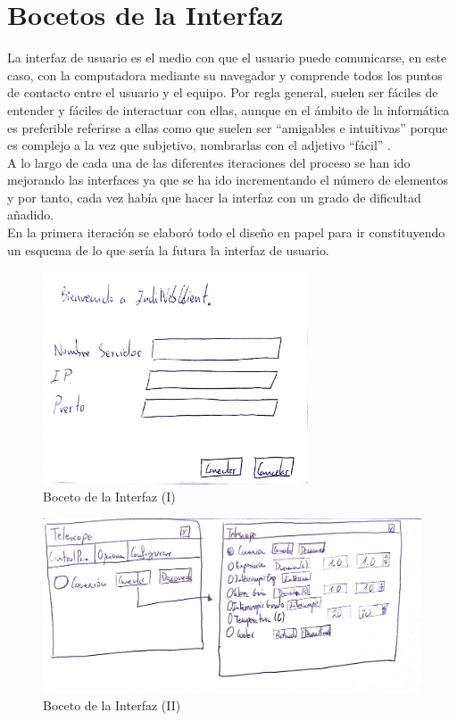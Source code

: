 \section{Bocetos de la Interfaz}
La interfaz de usuario es el medio con que el usuario puede comunicarse, en este caso, con la computadora mediante su navegador y comprende todos los puntos de contacto entre el usuario y el equipo. Por regla general, suelen ser fáciles de entender y fáciles de interactuar con ellas, aunque en el ámbito de la informática es preferible referirse a ellas como que suelen ser “amigables e intuitivas” porque es complejo a la vez que  subjetivo, nombrarlas con el adjetivo “fácil” \cite{IU}.\\

A lo largo de cada una de las diferentes iteraciones del proceso se han ido mejorando las interfaces ya que se ha ido incrementando el número de elementos y por tanto, cada vez había que hacer la interfaz con un grado de dificultad añadido.\\

En la primera iteración se elaboró todo el diseño en papel para ir constituyendo un esquema de lo que sería la futura la interfaz de usuario.\\
\begin{figure}[htb]
\centering
\includegraphics[width=0.7\textwidth]{./imagenes/boceto1}
\caption{Boceto de la Interfaz (I)} \label{fig:boceto1}
\end{figure}

\begin{figure}[htb]
\centering
\includegraphics[width=1\textwidth]{./imagenes/boceto2}
\caption{Boceto de la Interfaz (II)} \label{fig:boceto2}
\end{figure}

